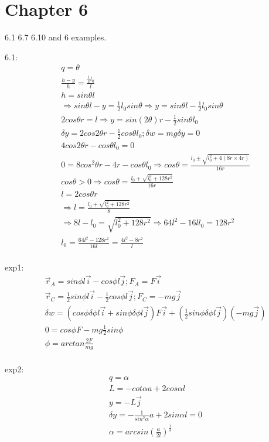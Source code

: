 \documentclass{article}
\begin{document}
\section{Chapter 6}
6.1 6.7 6.10 and 6 examples.

6.1:
\begin{align*}
  &q=\theta \\
  &\frac{h-y}{h}=\frac{\frac12l_0}l \\
  &h=sin\theta l \\
  & \Rightarrow sin\theta l-y=\frac12 l_0sin\theta\Rightarrow y=sin\theta l-\frac12l_0sin\theta \\
  &2cos\theta r=l\Rightarrow y=sin(2\theta)r-\frac12sin\theta l_0 \\
  &\delta y=2cos2\theta r-\frac12cos\theta l_0; \delta w= mg \delta y=0 \\
  &4cos2\theta r-cos\theta l_0=0 \\
  & 0=8cos^2\theta r -4r -cos\theta l_0\Rightarrow cos\theta=\frac{l_0\pm\sqrt{l_0^2+4(8r\times 4r)}}{16r} \\
  &cos\theta >0 \Rightarrow cos\theta =\frac{l_0+\sqrt{l_0^2+128r^2}}{16r} \\
  &l=2cos\theta r \\
  &\Rightarrow l=\frac{l_0+\sqrt{l_0^2+128r^2}}{8} \\
  & \Rightarrow 8l-l_0=\sqrt{l_0^2+128r^2}\Rightarrow 64l^2 -16ll_0=128r^2 \\
  &l_0=\frac{64l^2-128r^2}{16l}=\frac{4l^2-8r^2}l \\
\end{align*}

exp1:
\begin{align*}
&\vec r_A=sin\phi l \vec i-cos\phi l\vec j ; F_A=F\vec i\\
&\vec r_C=\frac12 sin\phi l\vec i-\frac 12cos\phi l \vec j;F_C=-mg \vec j \\
& \delta w=(cos\phi \delta \phi l \vec i+sin\phi \delta \phi l \vec j)F\vec i+(\frac12sin\phi \delta \phi l \vec j)(-mg \vec j) \\
&0=cos \phi F-mg\frac12 sin\phi \\
&\phi=arctan\frac{2F}{mg} \\
\end{align*}

exp2:
\begin{align*}
&q=\alpha \\
&L=-cot\alpha a+2cos\alpha l \\
&y=-L \vec j \\
& \delta y=-\frac1{sin^2\alpha}a+2sin\alpha l =0\\
&\alpha =arcsin(\frac{a}{2l})^{\frac13}
\end{align*}
\end{document}
